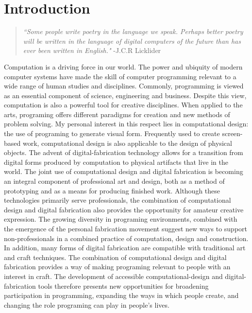 \chapter{Introduction}
\begin{quotation}

\textit{``Some people write poetry in the language we speak. Perhaps better poetry will be written in the language of digital computers of the future than has ever been written in English."}
-J.C.R Licklider
\end{quotation}


Computation is a driving force in our world. The power and ubiquity of  modern computer systems have made the skill of computer programming relevant to a wide range of human studies and disciplines. Commonly, programming is viewed as an essential component of science, engineering and business. Despite this view, computation is also a powerful tool for creative disciplines. When applied to the arts, programing offers different paradigms for creation and new methods of problem solving. My personal interest in this respect lies in computational design: the use of programing to generate visual form. Frequently used to create screen-based work, computational design is also applicable to the design of physical objects. The advent of digital-fabrication technology allows for a transition from digital forms produced by computation to physical artifacts that live in the world. The joint use of computational design and digital fabrication is becoming an integral component  of professional art and design, both as a method of prototyping and as a means for producing finished work. Although these technologies primarily serve professionals, the combination of computational design and digital fabrication also provides the opportunity for amateur creative expression. The growing diversity in programing environments, combined with the emergence of the personal fabrication movement suggest new ways to support non-professionals in a combined practice of computation, design and construction. In addition, many forms of digital fabrication are compatible with traditional art and craft techniques. The combination of computational design and digital fabrication provides a way of making programing relevant to people with an interest in craft.  The development of accessible computational-design and digital-fabrication tools therefore presents new opportunities for broadening participation in programming, expanding the ways in which people create, and changing the role programing can play in people's lives.


